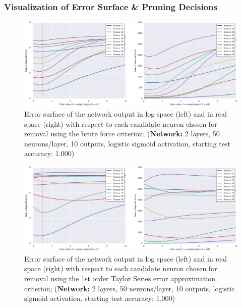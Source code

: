 \subsubsection{Visualization of Error Surface \& Pruning Decisions}

\begin{figure}[!hb]
\centering
\includegraphics[width=\linewidth]{png/mnist-deep-gt-gain.pdf}
\caption{Error surface of the network output in log space (left) and in real space (right) with respect to each candidate neuron chosen for removal using the brute force criterion; (\textbf{Network:} 2 layers, 50 neurons/layer, 10 outputs, logistic sigmoid activation, starting test accuracy: 1.000)}
\label{fig:mnist-gt-double-layer}
\end{figure}

\begin{figure}[!hb]
\centering
\includegraphics[width=\linewidth]{png/mnist-deep-g1-gain.pdf}
\caption{Error surface of the network output in log space (left) and in real space (right) with respect to each candidate neuron chosen for removal using the 1st order Taylor Series error approximation criterion; (\textbf{Network:} 2 layers, 50 neurons/layer, 10 outputs, logistic sigmoid activation, starting test accuracy: 1.000)}
\label{fig:mnist-g1-double-layer}
\end{figure}

